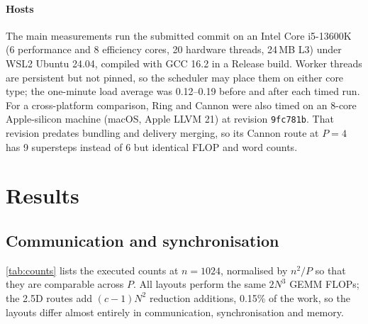 \documentclass[11pt,a4paper]{article}
\newcommand{\code}[1]{\texttt{#1}}
\begin{document}
\paragraph{Hosts}
The main measurements run the submitted commit on an Intel Core i5-13600K (6 performance and 8 efficiency
cores, 20 hardware threads, 24\,MB L3) under WSL2 Ubuntu 24.04, compiled with GCC 16.2 in a Release
build. Worker threads are persistent
but not pinned, so the scheduler may place them on either core type; the one-minute load average was
0.12--0.19 before and after each timed run. For a cross-platform comparison, Ring and Cannon were also
timed on an 8-core Apple-silicon machine (macOS, Apple LLVM 21) at revision \code{9fc781b}. That revision
predates bundling and delivery merging, so its Cannon route at $P=4$ has 9 supersteps instead of 6 but
identical FLOP and word counts.

\section{Results}
\label{sec:results}

\subsection{Communication and synchronisation}

\cref{tab:counts} lists the executed counts at $n=1024$, normalised by $n^2/P$ so that they are comparable
across $P$. All layouts perform the same $2N^3$ GEMM FLOPs; the 2.5D routes add $(c-1)N^2$ reduction
additions, 0.15\% of the work, so the layouts differ almost entirely in communication, synchronisation and
memory.
\end{document}
